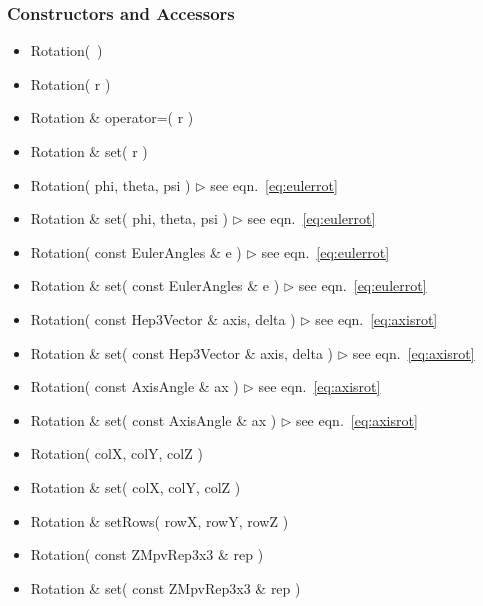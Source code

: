 \documentclass[twoside,12pt]{article}
\newcommand {\see}[1] {\hfill$\triangleright$ see eqn.~#1}
\newenvironment{shortlist}{%
\begin{itemize}
\setlength{\itemsep}{0pt}
\setlength{\parskip}{0pt}
}{%
\end{itemize}
}
\begin{document}
\subsubsection{Constructors and Accessors}

\begin{shortlist}
  \item Rotation(~)

  \item Rotation( r )
  \item Rotation \& operator=( r )
  \item Rotation \& set( r )

  \item Rotation( phi, theta, psi )			\see{\ref{eq:eulerrot}}
  \item Rotation \& set( phi, theta, psi )		\see{\ref{eq:eulerrot}}

  \item Rotation( const EulerAngles \& e )		\see{\ref{eq:eulerrot}}
  \item Rotation \& set( const EulerAngles \& e )	\see{\ref{eq:eulerrot}}

  \item Rotation( const Hep3Vector \& axis, delta )	\see{\ref{eq:axisrot}}
  \item Rotation \& set( const Hep3Vector \& axis, delta ) \see{\ref{eq:axisrot}}

  \item Rotation( const AxisAngle \& ax )		\see{\ref{eq:axisrot}}
  \item Rotation \& set( const AxisAngle \& ax )	\see{\ref{eq:axisrot}}

  \item Rotation( colX, colY, colZ )  
  \item Rotation \& set( colX, colY, colZ )
  \item Rotation \& setRows( rowX, rowY, rowZ )

  \item Rotation( const ZMpvRep3x3 \& rep )
  \item Rotation \& set( const ZMpvRep3x3 \& rep )

\end{shortlist}
\end{document}
